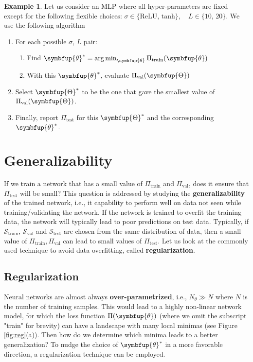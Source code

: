 \documentclass[11pt]{extarticle}
\newcommand{\ds}{\displaystyle}
\theoremstyle{definition}
\newcommand{\btheta}{\symbfup{\theta}}
\newcommand{\Hp}{\symbfup{\Theta}}
\DeclareMathOperator*{\amin}{\rm{\arg \min}}
\newtheorem{example}{Example}%
\begin{document}
\begin{example}
  Let us consider an MLP where all hyper-parameters are fixed except for the following flexible choices: $\ds\sigma \in \{\text{ReLU, tanh}\}, \quad L \in \{10,\,20\}$. We use the following algorithm
\begin{enumerate}
  \item For each possible $\sigma$, $L$ pair:
    \begin{enumerate}
      \item Find $\btheta^* = \amin_{\btheta} \Pi_\text{train}(\btheta)$
      \item With this $\btheta^*$, evaluate $\Pi_\text{val}(\Hp)$
    \end{enumerate}
  \item Select $\Hp^*$ to be the one that gave the smallest value of $\Pi_\text{val}(\Hp)$.	
  \item Finally, report $\Pi_\text{test}$ for this $\Hp^*$ and the corresponding $\btheta^*$.
\end{enumerate}
\end{example}

\section*{Generalizability} 
If we train a network that has a small value of $\Pi_\text{train}$ and $\Pi_\text{val}$, does it ensure that $\Pi_\text{test}$ will be small? This question is addressed by studying the \textbf{generalizability} of the trained network, i.e., it capability to perform well on data not seen while training/validating the network. If the network is trained to overfit the training data, the network will typically lead to poor predictions on test data. Typically, if $\mathcal{S}_\text{train}$, $\mathcal{S}_\text{val}$ and $\mathcal{S}_\text{test}$ are chosen from the same distribution of data, then a small value of $\Pi_\text{train},\Pi_\text{val}$ can lead to small values of $\Pi_\text{test}$. Let us look at the commonly used technique to avoid data overfitting, called \textbf{regularization}.

\subsection*{Regularization}\label{sec:reg}
Neural networks are almost always \textbf{over-parametrized}, i.e., $N_\theta \gg N$ where $N$ is the number of training samples. This would lead to a highly non-linear network model, for which the loss function $\Pi(\btheta)$ (where we omit the subscript "train" for brevity) can have a landscape with many local minimas (see Figure \ref{fig:reg}(a)). Then how do we determine which minima leads to a better generalization? To nudge the choice of $\btheta^*$ in a more favorable direction, a regularization technique can be employed.
\end{document}
